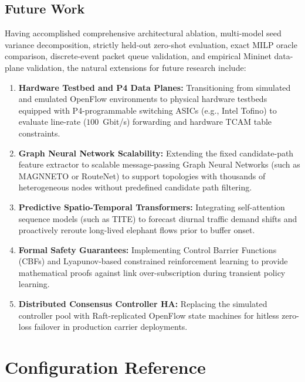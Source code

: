 \documentclass[12pt,a4paper,oneside]{report}
\begin{document}
\section{Future Work}
Having accomplished comprehensive architectural ablation, multi-model seed variance decomposition, strictly held-out zero-shot evaluation, exact MILP oracle comparison, discrete-event packet queue validation, and empirical Mininet data-plane validation, the natural extensions for future research include:
\begin{enumerate}
  \item \textbf{Hardware Testbed and P4 Data Planes:} Transitioning from simulated and emulated OpenFlow environments to physical hardware testbeds equipped with P4-programmable switching ASICs (e.g., Intel Tofino) to evaluate line-rate ($100$~Gbit/s) forwarding and hardware TCAM table constraints.
  \item \textbf{Graph Neural Network Scalability:} Extending the fixed candidate-path feature extractor to scalable message-passing Graph Neural Networks (such as MAGNNETO or RouteNet) to support topologies with thousands of heterogeneous nodes without predefined candidate path filtering.
  \item \textbf{Predictive Spatio-Temporal Transformers:} Integrating self-attention sequence models (such as TITE) to forecast diurnal traffic demand shifts and proactively reroute long-lived elephant flows prior to buffer onset.
  \item \textbf{Formal Safety Guarantees:} Implementing Control Barrier Functions (CBFs) and Lyapunov-based constrained reinforcement learning to provide mathematical proofs against link over-subscription during transient policy learning.
  \item \textbf{Distributed Consensus Controller HA:} Replacing the simulated controller pool with Raft-replicated OpenFlow state machines for hitless zero-loss failover in production carrier deployments.
\end{enumerate}

\appendix
\chapter{Configuration Reference}
\label{app:config}
\end{document}
